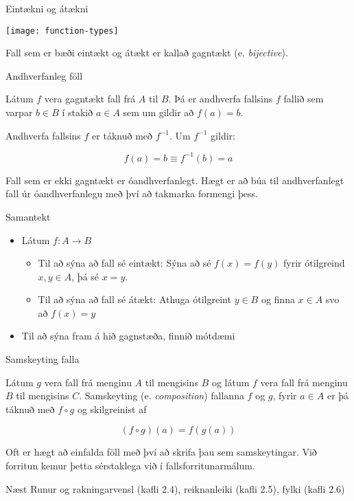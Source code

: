 \documentclass{beamer}
\begin{document}
\begin{frame}{Eintækni og átækni}
\begin{center}
\texttt{[image: function-types]}
\end{center}
Fall sem er bæði eintækt og átækt er kallað gagntækt (e. \emph{bijective}).
\end{frame}

\begin{frame}{Andhverfanleg föll}
\begin{tcolorbox}[title=Andhverfanlegt fall]
Látum $f$ vera gagntækt fall frá $A$ til $B$. Þá er andhverfa fallsins $f$ fallið sem varpar $b \in B$ í stakið $a \in A$ sem um gildir að $f(a) = b$.

Andhverfa fallsins $f$ er táknuð með $f^{-1}$. Um $f^{-1}$ gildir:

\[
 f(a) = b \equiv f^{-1}(b) = a
\]

\end{tcolorbox}
Fall sem er ekki gagntækt er óandhverfanlegt. Hægt er að búa til andhverfanlegt fall úr óandhverfanlegu með því að takmarka formengi þess.
\end{frame}

\begin{frame}{Samantekt}
\begin{itemize}
 \item Látum $f: A \to B$
 \begin{itemize}
  \item Til að sýna að fall sé eintækt: Sýna að sé $f(x) = f(y)$ fyrir ótilgreind $x, y \in A$, þá sé $x = y$.
  \item Til að sýna að fall sé átækt: Athuga ótilgreint $y \in B$ og finna $x \in A$ svo að $f(x) = y$
 \end{itemize}
 \item Til að sýna fram á hið gagnstæða, finnið mótdæmi
\end{itemize}

\end{frame}


\begin{frame}{Samskeyting falla}
\begin{tcolorbox}[title=Samskeyting falla]
Látum $g$ vera fall frá menginu $A$ til mengisins $B$ og látum $f$ vera fall frá menginu $B$ til mengisins $C$. Samskeyting (e. \emph{composition}) fallanna $f$ og $g$, fyrir $a \in A$ er þá táknuð með $f \circ g$ og skilgreinist af

\[
 (f \circ g)(a) = f(g(a))
\]

\end{tcolorbox}
Oft er hægt að einfalda föll með því að skrifa þau sem samskeytingar. Við forritun kemur þetta sérstaklega við í fallsforritunarmálum.
\end{frame}

\begin{frame}{Næst}
Runur og rakningarvensl (kafli 2.4), reiknanleiki (kafli 2.5), fylki (kafli 2.6)
\end{frame}
\end{document}
